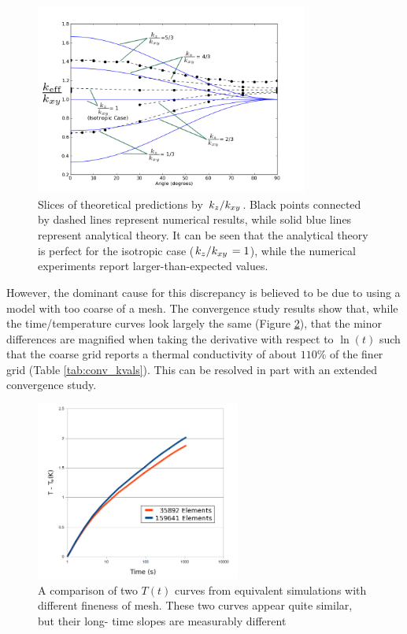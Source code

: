 \begin{figure}[h]
\centering
\includegraphics[width=0.8\textwidth]{fig/byKratio.png}
\caption{Slices of theoretical predictions by \(\left.{k_z}\middle/{k_{xy}}\right.\). Black points connected by dashed lines represent numerical results, while solid blue lines represent analytical theory. It can be seen that the analytical theory
is perfect for the isotropic case (\(\left.{k_z}\middle/{k_{xy}}\right. = 1\)), while the numerical experiments report larger-than-expected values.}
\label{fig:by_kratio}
\end{figure}

However, the dominant
cause for this discrepancy is believed to be due to using a model with too
coarse of a mesh. The convergence study results show that, while the time/temperature curves look
largely the same (Figure \ref{fig:conv_curves}), that the minor differences are magnified when taking the
derivative with respect to \(\ln(t)\) such that the coarse grid reports a
thermal conductivity of about \(110\%\) of the finer grid (Table \ref{tab:conv_kvals}).  This can be resolved in part with an extended convergence study.


\begin{figure}[h]
\centering
\includegraphics[width=0.6\textwidth]{fig/conv_curves.png}
\caption{A comparison of two \(T(t)\) curves from equivalent simulations with 
different fineness of mesh. These two curves appear quite similar, but their long-
time slopes are measurably different}
\label{fig:conv_curves}
\end{figure}


